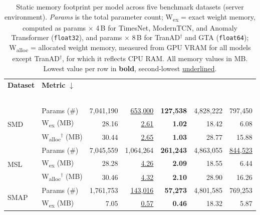 \documentclass[twoside,11pt,openright]{report}
\begin{document}
\begin{table}[ht]
\centering
\caption{Static memory footprint per model across five benchmark datasets (server environment).
\textit{Params} is the total parameter count;
W\textsubscript{ex} = exact weight memory, computed as params $\times$ 4\,B for 
TimesNet, ModernTCN, and Anomaly Transformer (\texttt{float32}), and params $\times$ 8\,B 
for TranAD$^\dagger$ and GTA (\texttt{float64});
W\textsubscript{alloc} = allocated weight memory, measured from GPU VRAM for all models 
except TranAD$^\dagger$, for which it reflects CPU RAM.
All memory values in MB.
Lowest value per row in \textbf{bold}, second-lowest \underline{underlined}.}
\label{tab:memory_static_server}
\begin{tabular}{ll rrrrr}
\toprule
\textbf{Dataset} & \textbf{Metric} $\downarrow$
    & \thead{\textbf{TimesNet}\\\citep{timesnet2023}}
    & \thead{\textbf{ModTCN}\\\citep{moderntcn2024}}
    & \thead{\textbf{TranAD}$^\dagger$\\\citep{tranad2022}}
    & \thead{\textbf{AnomTr.}\\\citep{anomalytransformer2022}}
    & \thead{\textbf{GTA}\\\citep{gta2022}} \\
\midrule
\multirow{3}{*}{SMD}
    & Params (\#)             & 7{,}041{,}190 & \underline{653{,}000} & \textbf{127{,}538} & 4{,}828{,}222 & 797{,}450 \\
    & W\textsubscript{ex} (MB)  &  28.16 & \underline{2.61} & \textbf{1.02} & 18.42 &  6.08 \\
    & W\textsubscript{alloc}$^\dagger$ (MB) &  30.44 & \underline{2.65} & \textbf{1.03} & 28.77 & 15.88 \\
\midrule
\multirow{3}{*}{MSL}
    & Params (\#)                 & 7{,}045{,}559 & 1{,}064{,}264 & \textbf{261{,}243} & 4{,}863{,}055 & \underline{844{,}523} \\
    & W\textsubscript{ex} (MB)  &  28.28 & \underline{4.26} & \textbf{2.09} & 18.55 &  6.44 \\
    & W\textsubscript{alloc}$^\dagger$ (MB) &  30.46 & \underline{4.32} & \textbf{2.10} & 28.90 & 16.26 \\
\midrule
\multirow{3}{*}{SMAP}
    & Params (\#)             & 1{,}761{,}753 & \underline{143{,}016 } & \textbf{57{,}273} & 4{,}801{,}585 & 769{,}253 \\
    & W\textsubscript{ex} (MB)  & 7.05 &  \underline{0.57} & \textbf{0.46} & 18.32 &  5.87 \\

\end{tabular}
\end{table}
\end{document}
